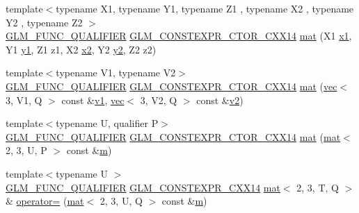 \begin{DoxyCompactItemize}
{\footnotesize template$<$typename X1, typename Y1, typename Z1 , typename X2 , typename Y2 , typename Z2 $>$ }\\\mbox{\hyperlink{setup_8hpp_a33fdea6f91c5f834105f7415e2a64407}{G\+L\+M\+\_\+\+F\+U\+N\+C\+\_\+\+Q\+U\+A\+L\+I\+F\+I\+ER}} \mbox{\hyperlink{setup_8hpp_a0900f9145e68bf6061b6f5e7be3fa751}{G\+L\+M\+\_\+\+C\+O\+N\+S\+T\+E\+X\+P\+R\+\_\+\+C\+T\+O\+R\+\_\+\+C\+X\+X14}} \mbox{\hyperlink{structglm_1_1mat_3_012_00_013_00_01_t_00_01_q_01_4_a12429e3e8f84a37878a67490604c7173}{mat}} (X1 \mbox{\hyperlink{_s_d_l__opengl__glext_8h_a49825216c96caaeb09237b36651181c5}{x1}}, Y1 \mbox{\hyperlink{_s_d_l__opengl__glext_8h_a3af6c78fcdfccea028a5878bc747ef39}{y1}}, Z1 z1, X2 \mbox{\hyperlink{_s_d_l__opengl__glext_8h_a7b907a03236685c534d89d604cff23c8}{x2}}, Y2 \mbox{\hyperlink{_s_d_l__opengl__glext_8h_a2be1135ed68e8d80fa9e130c7814f8c2}{y2}}, Z2 z2)
\item 
{\footnotesize template$<$typename V1, typename V2$>$ }\\\mbox{\hyperlink{setup_8hpp_a33fdea6f91c5f834105f7415e2a64407}{G\+L\+M\+\_\+\+F\+U\+N\+C\+\_\+\+Q\+U\+A\+L\+I\+F\+I\+ER}} \mbox{\hyperlink{setup_8hpp_a0900f9145e68bf6061b6f5e7be3fa751}{G\+L\+M\+\_\+\+C\+O\+N\+S\+T\+E\+X\+P\+R\+\_\+\+C\+T\+O\+R\+\_\+\+C\+X\+X14}} \mbox{\hyperlink{structglm_1_1mat_3_012_00_013_00_01_t_00_01_q_01_4_a3e0d4479b6a5787d1d6116514c10cb0b}{mat}} (\mbox{\hyperlink{structglm_1_1vec}{vec}}$<$ 3, V1, Q $>$ const \&\mbox{\hyperlink{_s_d_l__opengl__glext_8h_a435c176a02c061b43e19bdf7c86cceae}{v1}}, \mbox{\hyperlink{structglm_1_1vec}{vec}}$<$ 3, V2, Q $>$ const \&\mbox{\hyperlink{_s_d_l__opengl__glext_8h_a0928f6d0f0f794ba000a21dfae422136}{v2}})
\item 
{\footnotesize template$<$typename U, qualifier P$>$ }\\\mbox{\hyperlink{setup_8hpp_a33fdea6f91c5f834105f7415e2a64407}{G\+L\+M\+\_\+\+F\+U\+N\+C\+\_\+\+Q\+U\+A\+L\+I\+F\+I\+ER}} \mbox{\hyperlink{setup_8hpp_a0900f9145e68bf6061b6f5e7be3fa751}{G\+L\+M\+\_\+\+C\+O\+N\+S\+T\+E\+X\+P\+R\+\_\+\+C\+T\+O\+R\+\_\+\+C\+X\+X14}} \mbox{\hyperlink{structglm_1_1mat_3_012_00_013_00_01_t_00_01_q_01_4_a6cbdbc4b3a71c347e4d695c9db686054}{mat}} (\mbox{\hyperlink{structglm_1_1mat}{mat}}$<$ 2, 3, U, P $>$ const \&\mbox{\hyperlink{_s_d_l__opengl__glext_8h_af593500c283bf1a787a6f947f503a5c2}{m}})
\item 
{\footnotesize template$<$typename U $>$ }\\\mbox{\hyperlink{setup_8hpp_a33fdea6f91c5f834105f7415e2a64407}{G\+L\+M\+\_\+\+F\+U\+N\+C\+\_\+\+Q\+U\+A\+L\+I\+F\+I\+ER}} \mbox{\hyperlink{setup_8hpp_a4dd12abf5e1164bc57f3a34671d03844}{G\+L\+M\+\_\+\+C\+O\+N\+S\+T\+E\+X\+P\+R\+\_\+\+C\+X\+X14}} \mbox{\hyperlink{structglm_1_1mat}{mat}}$<$ 2, 3, T, Q $>$ \& \mbox{\hyperlink{structglm_1_1mat_3_012_00_013_00_01_t_00_01_q_01_4_a6b5fd23ac7f9803d6b3a71d10b209bb4}{operator=}} (\mbox{\hyperlink{structglm_1_1mat}{mat}}$<$ 2, 3, U, Q $>$ const \&\mbox{\hyperlink{_s_d_l__opengl__glext_8h_af593500c283bf1a787a6f947f503a5c2}{m}})

\end{DoxyCompactItemize}
